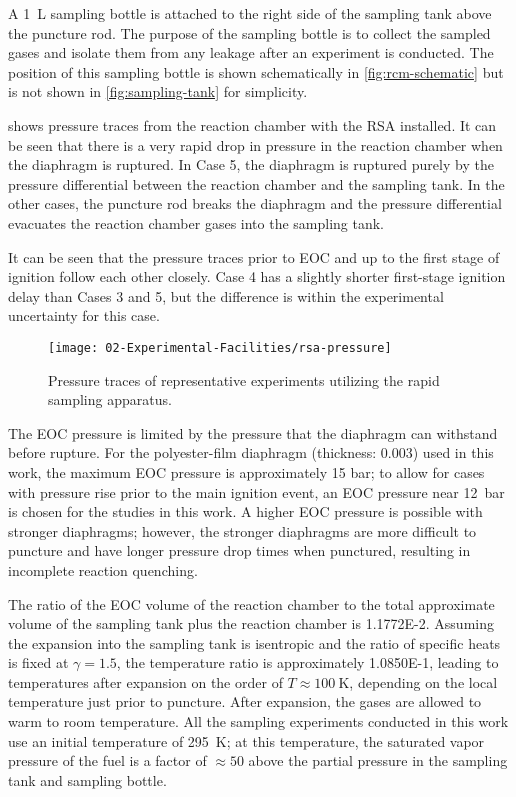 \documentclass[../main.tex]{subfiles}
\begin{document}
A \SI{1}{\liter} sampling bottle is attached to the right side of the sampling tank
above the puncture rod. The purpose of the sampling bottle is to collect
the sampled gases and isolate them from any leakage after an experiment is
conducted. The position of this sampling bottle is shown schematically in
\cref{fig:rcm-schematic} but is not shown in \cref{fig:sampling-tank} for
simplicity.

 shows pressure traces from the reaction chamber with the RSA installed.
It can be seen that there is a very rapid drop in pressure in the
reaction chamber when the diaphragm is ruptured. In Case 5, the diaphragm
is ruptured purely by the pressure differential between the reaction
chamber and the sampling tank. In the other cases, the puncture rod
breaks the diaphragm and the pressure differential evacuates the reaction
chamber gases into the sampling tank.

It can be seen that the pressure traces prior to EOC and up to the first
stage of ignition follow each other closely. Case 4 has a slightly shorter
first-stage ignition delay than Cases 3 and 5, but the difference is
within the experimental uncertainty for this case.

\begin{figure}
\texttt{[image: 02-Experimental-Facilities/rsa-pressure]}
\caption{Pressure traces of representative experiments utilizing the
rapid sampling apparatus.}
\label{fig:rsa-pressure}
\end{figure}

The EOC pressure is limited by the pressure that the diaphragm can withstand
before rupture. For the polyester-film diaphragm (thickness: \SI{0.003}{\inch})
used in this work, the maximum EOC pressure is approximately 15 bar; to allow
for cases with pressure rise prior to the main ignition event, an EOC pressure
near \SI{12}{\bar} is chosen for the studies in this work. A higher EOC pressure
is possible with stronger diaphragms; however, the stronger diaphragms are more
difficult to puncture and have longer pressure drop times when punctured,
resulting in incomplete reaction quenching.

The ratio of the EOC volume of the reaction chamber to the total
approximate volume of the sampling tank plus the reaction chamber is
\num{1.1772E-2}. Assuming the expansion into the sampling tank is
isentropic and the ratio of specific heats is fixed at $\gamma=1.5$,
the temperature ratio is approximately \num{1.0850E-1}, leading to
temperatures after expansion on the order of $T\approx\SI{100}{\kelvin}$,
depending on the local temperature just prior to puncture. After expansion, the gases are allowed to warm to room
temperature. All the sampling experiments conducted in this work use an
initial temperature of \SI{295}{\kelvin}; at this temperature, the saturated
vapor pressure of the fuel is a factor of $\approx\num{50}$ above the
partial pressure in the sampling tank and sampling bottle.
\end{document}
